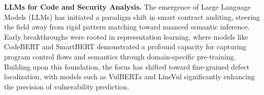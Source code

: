 

\noindent
\textbf{LLMs for Code and Security Analysis.}
The emergence of Large Language Models (LLMs) has initiated a paradigm shift in smart contract auditing, steering the field away from rigid pattern matching toward nuanced semantic inference. Early breakthroughs were rooted in representation learning, where models like CodeBERT \cite{feng-etal-2020-codebert} and SmartBERT demonstrated a profound capacity for capturing program control flows and semantics through domain-specific pre-training. Building upon this foundation, the focus has shifted toward fine-grained defect localization, with models such as VulBERTa \cite{hanif2022vulberta} and LineVul \cite{fu2022linevul} significantly enhancing the precision of vulnerability prediction.

